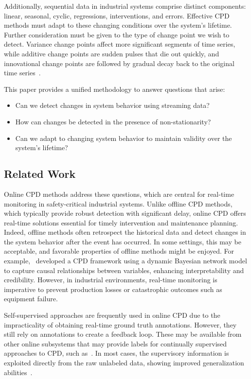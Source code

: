Additionally, sequential data in industrial systems comprise distinct components: linear, seasonal, cyclic, regressions, interventions, and errors. Effective CPD methods must adapt to these changing conditions over the system's lifetime. Further consideration must be given to the type of change point we wish to detect. Variance change points affect more significant segments of time series, while additive change points are sudden pulses that die out quickly, and innovational change points are followed by gradual decay back to the original time series~\cite{Srivastava2017}.

This paper provides a unified methodology to answer questions that arise:
\begin{itemize}
	\item Can we detect changes in system behavior using streaming data?
	\item How can changes be detected in the presence of non-stationarity?
	\item Can we adapt to changing system behavior to maintain validity over the system's lifetime?
\end{itemize}

\subsection{Related Work}
Online CPD methods address these questions, which are central for real-time monitoring in safety-critical industrial systems. Unlike offline CPD methods, which typically provide robust detection with significant delay, online CPD offers real-time solutions essential for timely intervention and maintenance planning. Indeed, offline methods often retrospect the historical data and detect changes in the system behavior after the event has occurred. In some settings, this may be acceptable, and favorable properties of offline methods might be enjoyed. For example,~\cite{Liu2022} developed a CPD framework using a dynamic Bayesian network model to capture causal relationships between variables, enhancing interpretability and credibility. However, in industrial environments, real-time monitoring is imperative to prevent production losses or catastrophic outcomes such as equipment failure.

Self-supervised approaches are frequently used in online CPD due to the impracticality of obtaining real-time ground truth annotations. However, they still rely on annotations to create a feedback loop. These may be available from other online subsystems that may provide labels for continually supervised approaches to CPD, such as~\cite{Korycki2021}. In most cases, the supervisory information is exploited directly from the raw unlabeled data, showing improved generalization abilities~\cite{Zhang2024}.  %

